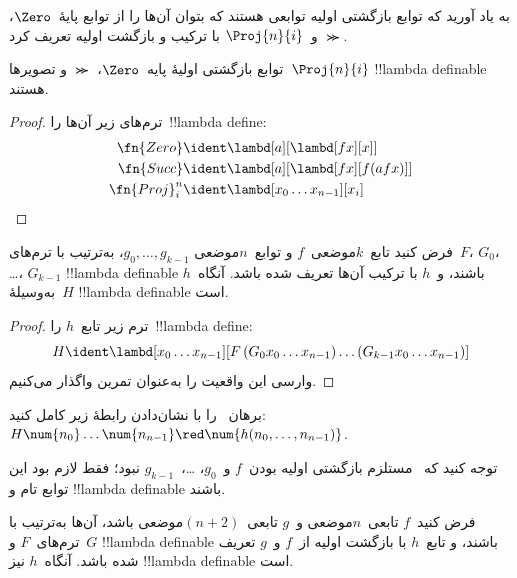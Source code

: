 \documentclass[../../../include/open-logic-section]{subfiles}
\begin{document}

به یاد آورید که توابع بازگشتی اولیه توابعی هستند که بتوان آن‌ها را از
توابع پایهٔ~$\Zero$، $\Succ$ و~$\Proj{n}{i}$ با ترکیب و بازگشت اولیه
تعریف کرد.

\begin{lem}
  توابع بازگشتی اولیهٔ پایه~$\Zero$، $\Succ$ و تصویرها~$\Proj{n}{i}$
  !!{lambda definable} هستند.
\end{lem}

\begin{proof}
ترم‌های زیر آن‌ها را~!!{lambda define}:
\begin{align*}
  \fn{Zero} & \ident \lambd[a][\lambd[fx][x]]\\
  \fn{Succ} & \ident \lambd[a][\lambd[fx][f (a f x)]] \\
  \fn{Proj}^n_i & \ident \lambd[x_0\dots x_{n-1}][x_i]
\end{align*}
\end{proof}

\begin{lem}
   فرض کنید تابع~$k$موضعی~$f$ و توابع~$n$موضعی
  $g_0, \dots, g_{k-1}$، به‌ترتیب با ترم‌های~$F$، $G_0$، \dots،
  $G_{k-1}$ !!{lambda definable} باشند، و~$h$ با ترکیب آن‌ها تعریف شده
  باشد. آنگاه~$h$ به‌وسیلهٔ~$H$ !!{lambda definable} است.
\end{lem}

\begin{proof}
  ترم زیر تابع~$h$ را~!!{lambda define}:
  \[
  H \ident \lambd[x_0 \dots x_{n-1}][F\, (G_0 x_0 \dots
    x_{n-1}) \dots (G_{k-1} x_0 \dots x_{n-1})]
  \]
  وارسی این واقعیت را به‌عنوان تمرین واگذار می‌کنیم.
\end{proof}

\begin{prob}
  برهان~ را با نشان‌دادن رابطهٔ زیر
  کامل کنید:
  $H\num{n_0}\dots\num{n_{n-1}} \red \num{h(n_0, \dots,
    n_{n-1})}$.
\end{prob}

توجه کنید که~ مستلزم بازگشتی اولیه بودن~$f$ و~$g_0$،
\dots،~$g_{k-1}$ نبود؛ فقط لازم بود این توابع تام و
!!{lambda definable} باشند.

\begin{lem}
  فرض کنید~$f$ تابعی~$n$موضعی و~$g$ تابعی~$(n+2)$موضعی باشد، آن‌ها
  به‌ترتیب با ترم‌های~$F$ و~$G$ !!{lambda definable} باشند، و تابع~$h$
  با بازگشت اولیه از~$f$ و~$g$ تعریف شده باشد. آنگاه~$h$ نیز
  !!{lambda definable} است.
\end{lem}
\end{document}
